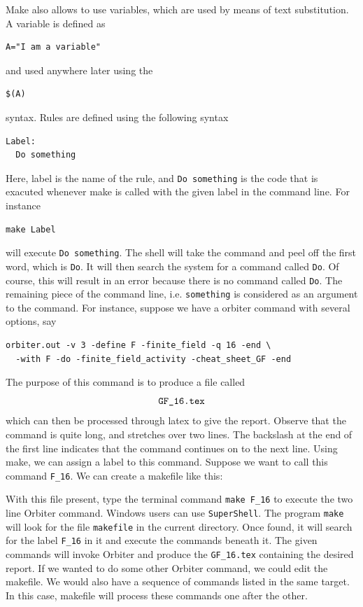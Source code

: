 Make also allows to use variables, which are used by means of text substitution.
A variable 
is defined as 
\begin{verbatim}
A="I am a variable"
\end{verbatim}
and used anywhere later using the 
\begin{verbatim}
$(A)
\end{verbatim}
syntax. 
Rules are defined using the following syntax
\begin{verbatim}
Label:
  Do something
\end{verbatim}
Here, label is the name of the rule, and \verb'Do something' is the code that is exacuted whenever make is called 
with the given label in the command line. For instance
\begin{verbatim}
make Label
\end{verbatim}
will execute \verb'Do something'. 
The shell will take the command and peel off the first word, which is \verb'Do'. It will then search the 
system for a command called \verb'Do'.  Of course, this will result in an error because there is no command called \verb'Do'.
The remaining piece of the command line, i.e. \verb'something' is considered as an argument to the command. 
For instance, suppose we have a orbiter command with several options, say 
\begin{verbatim}
orbiter.out -v 3 -define F -finite_field -q 16 -end \
  -with F -do -finite_field_activity -cheat_sheet_GF -end
\end{verbatim}
The purpose of this command is to produce a file called 
$$
\verb'GF_16.tex'
$$ 
which can then be processed through latex to give the report. 
Observe that the command is quite long, and stretches over two lines. 
The backslash at the end of the first line indicates that the command continues on to the next line.
Using make, we can assign a label to this command. 
Suppose we want to call this command \verb'F_16'.
We can create a makefile like this:


With this file present, type the terminal command \verb'make F_16' to 
execute the two line Orbiter command.
Windows users can use \verb'SuperShell'.
The program \verb'make' will look for the file \verb'makefile' in the current directory.
Once found, it will search for the label \verb'F_16' in it and execute the commands beneath it.
The given commands will invoke Orbiter and produce the \verb'GF_16.tex' containing the desired report.
If we wanted to do some other Orbiter command, 
we could edit the makefile. 
We would also have a sequence of commands listed in the same target. 
In this case, makefile will process these commands one after the other.


